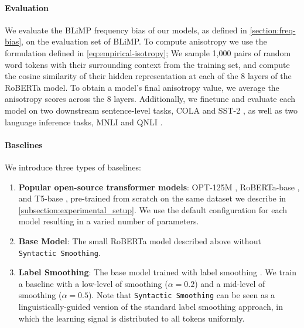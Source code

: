 \paragraph{Evaluation} We evaluate the BLiMP frequency bias of our models, as defined in \cref{section:freq-bias}, on the evaluation set of BLiMP. To compute anisotropy we use the formulation defined in \cref{eq:empirical-isotropy}; We sample 1,000 pairs of random word tokens with their surrounding context from the training set, and compute the cosine similarity of their hidden representation at each of the 8 layers of the RoBERTa model. To obtain a model's final anisotropy value, we average the anisotropy scores across the 8 layers. Additionally, we finetune and evaluate each model on two downstream sentence-level tasks, COLA \citep{warstadt2019cola} and SST-2 \citep{socher2013sst}, as well as two language inference tasks, MNLI \citep{williams2018mnli} and QNLI \citep{rajpurkar2016squad, wang2018glue}.


\paragraph{Baselines}

We introduce three types of baselines: 
\begin{enumerate}
    \item \textbf{Popular open-source transformer models}: OPT-125M \citep{zhang2022opt}, RoBERTa-base \citep{liu2019roberta}, and T5-base \citep{raffel2020t5}, pre-trained from scratch on the same dataset we describe in \cref{subsection:experimental_setup}. We use the default configuration for each model resulting in a varied number of parameters.
    \item \textbf{Base Model}: The small RoBERTa model described above without \texttt{Syntactic Smoothing}.
    \item \textbf{Label Smoothing}: The base model trained with label smoothing \citep{szegedy2016rethinking}.  We train a baseline with a low-level of smoothing ($\alpha=0.2$) and a mid-level of smoothing ($\alpha=0.5$). Note that \texttt{Syntactic Smoothing} can be seen as a linguistically-guided version of the standard label smoothing approach, in which the learning signal is distributed to all tokens uniformly.
\end{enumerate}


